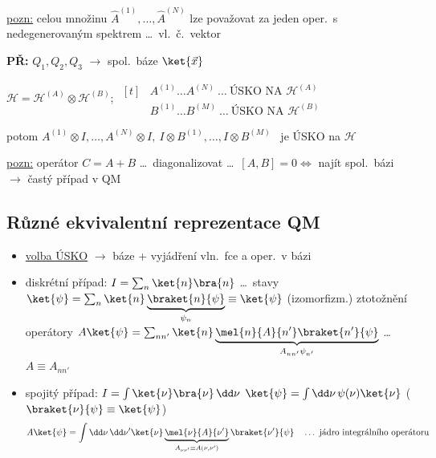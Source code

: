 \underline{pozn:} celou množinu $\hat A^{(1)},\dots,\hat A^{(N)}$ lze považovat za jeden oper.\ s nedegenerovaným spektrem \dots\ vl.\ č.\ vektor

\textbf{PŘ:} \quad $Q_1, Q_2, Q_3$ \quad $\to$ spol.\ báze $\ket{\vec x}$

\begin{priklad}
$\mathcal{H} = \mathcal{H}^{(A)}\otimes\mathcal{H}^{(B)}$; \quad
$\begin{aligned}[t] &A^{(1)}\dots A^{(N)} \ \dots\ \text{ÚSKO NA } \mathcal{H}^{(A)} \\ &B^{(1)}\dots B^{(M)} \ \dots\ \text{ÚSKO NA } \mathcal{H}^{(B)}\end{aligned}$

potom \quad $A^{(1)}\otimes I,\dots,A^{(N)}\otimes I,\ I\otimes B^{(1)},\dots,I\otimes B^{(M)}$ \ je ÚSKO na $\mathcal{H}$
\end{priklad}
\underline{pozn:} operátor $C = A + B$ \dots\ diagonalizovat \dots\ $[A,B] = 0 \Leftrightarrow$ najít spol.\ bázi $\to$ častý případ v QM

\subsection*{Různé ekvivalentní reprezentace QM}
\begin{itemize}
  \item \underline{volba ÚSKO} $\to$ báze + vyjádření vln.\ fce a oper.\ v bázi
\end{itemize}
\begin{itemize}[nosep]
  \item[--] diskrétní případ: \quad $I = \sum_n\ket{n}\bra{n}$ \quad \dots\ stavy \quad
  $\ket{\psi} = \sum_n\ket{n}\underbrace{\braket{n}{\psi}}_{\psi_n} \equiv \ket{\psi}$ \quad (izomorfizm.) ztotožnění \\
  operátory \quad $A\ket{\psi} = \sum_{nn'}\ket{n}\underbrace{\mel{n}{A}{n'}\braket{n'}{\psi}}_{A_{nn'}\psi_{n'}}$ \quad \dots\ $A\equiv A_{nn'}$
  \item[--] spojitý případ: \quad $I = \int\ket{\nu}\bra{\nu}\,\dd\nu$ \quad
  $\ket{\psi} = \int\dd\nu\,\psi(\nu)\ket{\nu}$ \quad ($\braket{\nu}{\psi} \equiv \ket{\psi}$)
  \[
    A\ket{\psi} = \int\dd\nu\,\dd\nu'\ket{\nu}\underbrace{\mel{\nu}{A}{\nu'}}_{A_{\nu\nu'}\equiv A(\nu,\nu')}\braket{\nu'}{\psi}
    \quad\dots\ \text{jádro integrálního operátoru}
  \]
\end{itemize}

